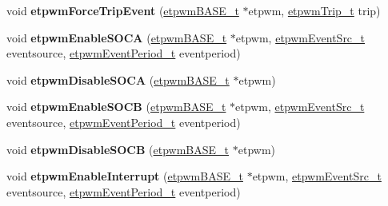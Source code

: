\begin{DoxyCompactItemize}
void {\bfseries etpwm\+Force\+Trip\+Event} (\mbox{\hyperlink{reg__etpwm_8h_a3030c3a8f18ffd60ee3de5bbd7632891}{etpwm\+B\+A\+S\+E\+\_\+t}} $\ast$etpwm, \mbox{\hyperlink{etpwm_8h_a1d25b4cd16ce2c7ee79696b690abb2fd}{etpwm\+Trip\+\_\+t}} trip)
\item 
\mbox{\label{group__ePWM_ga97c75e033f952492ec86ebfc8e0f6a96}} 
void {\bfseries etpwm\+Enable\+S\+O\+CA} (\mbox{\hyperlink{reg__etpwm_8h_a3030c3a8f18ffd60ee3de5bbd7632891}{etpwm\+B\+A\+S\+E\+\_\+t}} $\ast$etpwm, \mbox{\hyperlink{etpwm_8h_a8d2b2b041536cea8436f44321e60b226}{etpwm\+Event\+Src\+\_\+t}} eventsource, \mbox{\hyperlink{etpwm_8h_a4d74cb9cd3a3e07b2fa0d26745ba15d5}{etpwm\+Event\+Period\+\_\+t}} eventperiod)
\item 
\mbox{\label{group__ePWM_ga56dd00efc9beb1d674ef6ebe0e732cf4}} 
void {\bfseries etpwm\+Disable\+S\+O\+CA} (\mbox{\hyperlink{reg__etpwm_8h_a3030c3a8f18ffd60ee3de5bbd7632891}{etpwm\+B\+A\+S\+E\+\_\+t}} $\ast$etpwm)
\item 
\mbox{\label{group__ePWM_gad9b5d9807c1dda60c9708ec5064c1b4a}} 
void {\bfseries etpwm\+Enable\+S\+O\+CB} (\mbox{\hyperlink{reg__etpwm_8h_a3030c3a8f18ffd60ee3de5bbd7632891}{etpwm\+B\+A\+S\+E\+\_\+t}} $\ast$etpwm, \mbox{\hyperlink{etpwm_8h_a8d2b2b041536cea8436f44321e60b226}{etpwm\+Event\+Src\+\_\+t}} eventsource, \mbox{\hyperlink{etpwm_8h_a4d74cb9cd3a3e07b2fa0d26745ba15d5}{etpwm\+Event\+Period\+\_\+t}} eventperiod)
\item 
\mbox{\label{group__ePWM_ga74788aa06e235ff75c0169368a5ee256}} 
void {\bfseries etpwm\+Disable\+S\+O\+CB} (\mbox{\hyperlink{reg__etpwm_8h_a3030c3a8f18ffd60ee3de5bbd7632891}{etpwm\+B\+A\+S\+E\+\_\+t}} $\ast$etpwm)
\item 
\mbox{\label{group__ePWM_ga23b9209cd3f9f086335ad7b422963c07}} 
void {\bfseries etpwm\+Enable\+Interrupt} (\mbox{\hyperlink{reg__etpwm_8h_a3030c3a8f18ffd60ee3de5bbd7632891}{etpwm\+B\+A\+S\+E\+\_\+t}} $\ast$etpwm, \mbox{\hyperlink{etpwm_8h_a8d2b2b041536cea8436f44321e60b226}{etpwm\+Event\+Src\+\_\+t}} eventsource, \mbox{\hyperlink{etpwm_8h_a4d74cb9cd3a3e07b2fa0d26745ba15d5}{etpwm\+Event\+Period\+\_\+t}} eventperiod)
\item 
\mbox{\label{group__ePWM_gaa4a74e6f0094fbaac3f07641ffd8bb81}} 

\end{DoxyCompactItemize}

